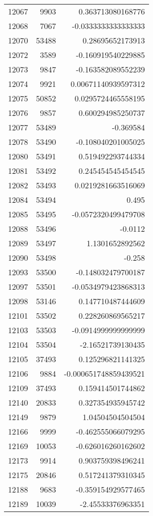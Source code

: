 \begin{tabular}{r | r | r}
12067 & 9903 & 0.363713080168776 \\
12068 & 7067 & -0.0333333333333333 \\
12070 & 53488 & 0.28695652173913 \\
12072 & 3589 & -0.160919540229885 \\
12073 & 9847 & -0.163582089552239 \\
12074 & 9921 & 0.00671140939597312 \\
12075 & 50852 & 0.0295724465558195 \\
12076 & 9857 & 0.600294985250737 \\
12077 & 53489 & -0.369584 \\
12078 & 53490 & -0.108040201005025 \\
12080 & 53491 & 0.519492293744334 \\
12081 & 53492 & 0.245454545454545 \\
12082 & 53493 & 0.0219281663516069 \\
12084 & 53494 & 0.495 \\
12085 & 53495 & -0.0572320499479708 \\
12088 & 53496 & -0.0112 \\
12089 & 53497 & 1.1301652892562 \\
12090 & 53498 & -0.258 \\
12093 & 53500 & -0.148032479700187 \\
12097 & 53501 & -0.0534979423868313 \\
12098 & 53146 & 0.147710487444609 \\
12101 & 53502 & 0.228260869565217 \\
12103 & 53503 & -0.0914999999999999 \\
12104 & 53504 & -2.16521739130435 \\
12105 & 37493 & 0.125296821141325 \\
12106 & 9884 & -0.000651748859439521 \\
12109 & 37493 & 0.159414501744862 \\
12140 & 20833 & 0.327354935945742 \\
12149 & 9879 & 1.04504504504504 \\
12166 & 9999 & -0.462555066079295 \\
12169 & 10053 & -0.626016260162602 \\
12173 & 9914 & 0.903759398496241 \\
12175 & 20846 & 0.517241379310345 \\
12188 & 9683 & -0.359154929577465 \\
12189 & 10039 & -2.45533376963351 \\

\end{tabular}
